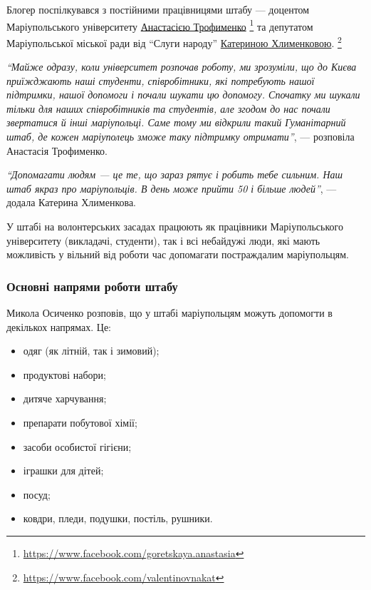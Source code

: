 Блогер поспілкувався з постійними працівницями штабу — доцентом Маріупольського
університету \href{https://www.facebook.com/goretskaya.anastasia}{Анастасією Трофименко}%
\footnote{\url{https://www.facebook.com/goretskaya.anastasia}} та депутатом
Маріупольської міської ради від \enquote{Слуги народу} \href{https://www.facebook.com/valentinovnakat}{Катериною Хлименковою}.%
\footnote{\url{https://www.facebook.com/valentinovnakat}}

\begin{leftbar}
\emph{\enquote{Майже одразу, коли університет розпочав роботу, ми зрозуміли, що до Києва
приїжджають наші студенти, співробітники, які потребують нашої підтримки, нашої
допомоги і почали шукати цю допомогу. Спочатку ми шукали тільки для наших
співробітників та студентів, але згодом до нас почали звертатися й інші
маріупольці. Саме тому ми відкрили такий Гуманітарний штаб, де кожен
маріуполець зможе таку підтримку отримати}}, — розповіла Анастасія Трофименко.
\end{leftbar}


\begin{leftbar}
\emph{\enquote{Допомагати людям — це те, що зараз рятує і робить тебе сильним. Наш штаб якраз
про маріупольців. В день може прийти 50 і більше людей}}, — додала Катерина
Хлименкова.
\end{leftbar}

У штабі на волонтерських засадах працюють як працівники Маріупольського
університету (викладачі, студенти), так і всі небайдужі люди, які мають
можливість у вільний від роботи час допомагати постраждалим маріупольцям.

\subsubsection{Основні напрями роботи штабу}

Микола Осиченко розповів, що у штабі маріупольцям можуть допомогти в декількох
напрямах. Це:

\begin{itemize}
  \item одяг (як літній, так і зимовий);
  \item продуктові набори;
  \item дитяче харчування;
  \item препарати побутової хімії;
  \item засоби особистої гігієни;
  \item іграшки для дітей;
  \item посуд;
  \item ковдри, пледи, подушки, постіль, рушники.
\end{itemize}

